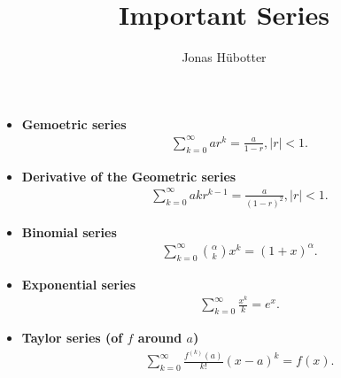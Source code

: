 \documentclass{article}
\title{Important Series}
\author{Jonas Hübotter}
\date{}
\begin{document}
\maketitle

\begin{itemize}
    \item \textbf{Gemoetric series}
        \begin{align*}
            &\sum_{k=0}^\infty a r^k = \frac{a}{1-r}, |r| < 1.
        \end{align*}
    \item \textbf{Derivative of the Geometric series}
        \begin{align*}
            &\sum_{k=0}^\infty a k r^{k-1} = \frac{a}{(1-r)^2}, |r| < 1.
        \end{align*}
    \item \textbf{Binomial series}
        \begin{align*}
            &\sum_{k=0}^\infty {\alpha \choose k} x^k = (1+x)^\alpha.
        \end{align*}
    \item \textbf{Exponential series}
        \begin{align*}
            &\sum_{k=0}^\infty \frac{x^k}{k} = e^x.
        \end{align*}
    \item \textbf{Taylor series (of $f$ around $a$)}
        \begin{align*}
            &\sum_{k=0}^\infty \frac{f^{(k)}(a)}{k!} (x-a)^k = f(x).
        \end{align*}
\end{itemize}
\end{document}
